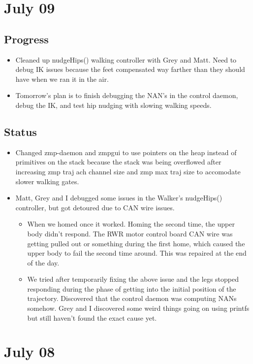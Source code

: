 \documentclass[letterpaper, 10 pt]{report}
\begin{document}
\section*{July 09}
\subsection*{Progress}
\begin{itemize}
\item Cleaned up nudgeHips() walking controller with Grey and Matt. Need to debug IK issues because the feet compensated way farther than they should have when we ran it in the air.
\item Tomorrow's plan is to finish debugging the NAN's in the control daemon, debug the IK, and test hip nudging with slowing walking speeds.
\end{itemize}
\subsection*{Status}
\begin{itemize}
\item Changed zmp-daemon and zmpgui to use pointers on the heap instead of primitives on the stack because the stack was being overflowed after increasing zmp traj ach channel size and zmp max traj size to accomodate slower walking gates.
\item Matt, Grey and I debugged some issues in the Walker's nudgeHips() controller, but got detoured due to CAN wire issues.
\begin{itemize}
\item When we homed once it worked. Homing the second time, the upper body didn't respond. The RWR motor control board CAN wire was getting pulled out or something during the first home, which caused the upper body to fail the second time around. This was repaired at the end of the day.
\item We tried after temporarily fixing the above issue and the legs stopped responding during the phase of getting into the initial position of the trajectory. Discovered that the control daemon was computing NANs somehow. Grey and I discovered some weird things going on using printfs but still haven't found the exact cause yet.
\end{itemize}
\end{itemize}

\section*{July 08}
\end{document}
